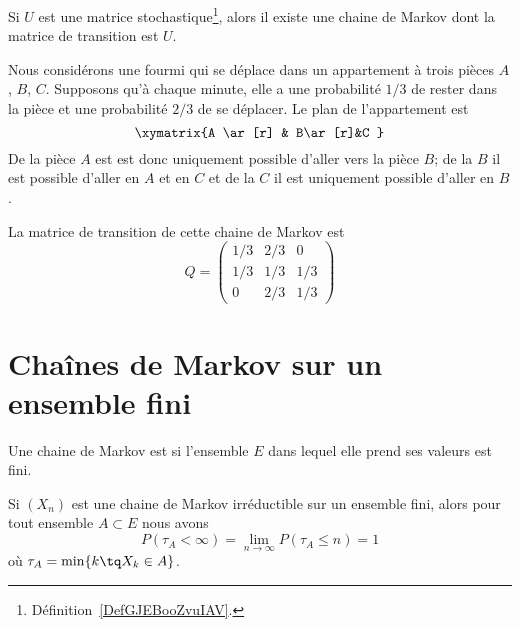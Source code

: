 \begin{lemma}       \label{LEMooQBOIooMNbJlV}
	Si \( U\) est une matrice stochastique\footnote{Définition~\ref{DefGJEBooZvuIAV}.}, alors il existe une chaine de Markov dont la matrice de transition est \( U\).
\end{lemma}


\begin{example}
	Nous considérons une fourmi qui se déplace dans un appartement à trois pièces \( A\), \( B\), \( C\). Supposons qu'à chaque minute, elle a une probabilité \( 1/3\) de rester dans la pièce et une probabilité \( 2/3\) de se déplacer. Le plan de l'appartement est
	\begin{equation}
		\xymatrix{%
			A \ar[r]      &  B\ar[r]&C
		}
	\end{equation}
	De la pièce \( A\) est est donc uniquement possible d'aller vers la pièce \( B\); de la \( B\) il est possible d'aller en \( A\) et en \( C\) et de la \( C\) il est uniquement possible d'aller en \( B\).

	La matrice de transition de cette chaine de Markov est
	\begin{equation}
		Q=\begin{pmatrix}
			1/3 & 2/3 & 0   \\
			1/3 & 1/3 & 1/3 \\
			0   & 2/3 & 1/3
		\end{pmatrix}
	\end{equation}
\end{example}


\section{Chaînes de Markov sur un ensemble fini}

\begin{definition}
	Une chaine de Markov est  si l'ensemble \( E\) dans lequel elle prend ses valeurs est fini.
\end{definition}

\begin{proposition}
	Si \( (X_n)\) est une chaine de Markov irréductible sur un ensemble fini, alors pour tout ensemble \( A\subset E\) nous avons
	\begin{equation}
		P(\tau_A<\infty)=\lim_{n\to \infty} P(\tau_A\leq n)=1
	\end{equation}
	où \( \tau_A=\min\{ k\tq X_k\in A \}\).
\end{proposition}

